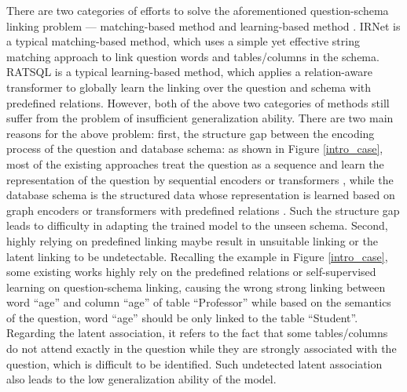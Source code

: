 \documentclass{article}
\begin{document}
There are two categories of efforts to solve the aforementioned question-schema linking problem --- matching-based method \citep{guo2019towards} and learning-based method \citep{wang2020rat, lin2020bridging, lei2020re, cao-etal-2021-lgesql}. IRNet \citep{guo2019towards} is a typical matching-based method, which uses a simple yet effective string matching approach to link question words and tables/columns in the schema. RATSQL \citep{wang2020rat} is a typical learning-based method, which applies a relation-aware transformer to globally learn the linking over the question and schema with predefined relations. However, both of the above two categories of methods still suffer from the problem of insufficient generalization ability. There are two main reasons for the above problem: 
first, the structure gap between the encoding process of the question and database schema: as shown in Figure \ref{intro_case}, most of the existing approaches treat the question as a sequence and learn the representation of the question by sequential encoders \citep{guo2019towards, bogin2019representing, bogin2019global} or transformers \citep{wang2020rat, xu2021optimizing, lin2020bridging}, while the database schema is the structured data whose representation is learned based on graph encoders \citep{cao-etal-2021-lgesql, bogin2019representing, bogin2019global} or transformers with predefined relations \citep{wang2020rat, xu2021optimizing}. Such the structure gap leads to difficulty in adapting the trained model to the unseen schema.
Second, highly relying on predefined linking maybe result in unsuitable linking or the latent linking to be undetectable. Recalling the example in Figure \ref{intro_case}, some existing works highly rely on the predefined relations or self-supervised learning on question-schema linking, causing the wrong strong linking between word ``age'' and column ``age'' of table ``Professor'' while based on the semantics of the question, word ``age'' should be only linked to the table ``Student''.
Regarding the latent association, it refers to the fact that some tables/columns do not attend exactly in the question while they are strongly associated with the question, which is difficult to be identified. Such undetected latent association also leads to the low generalization ability of the model.
\end{document}
